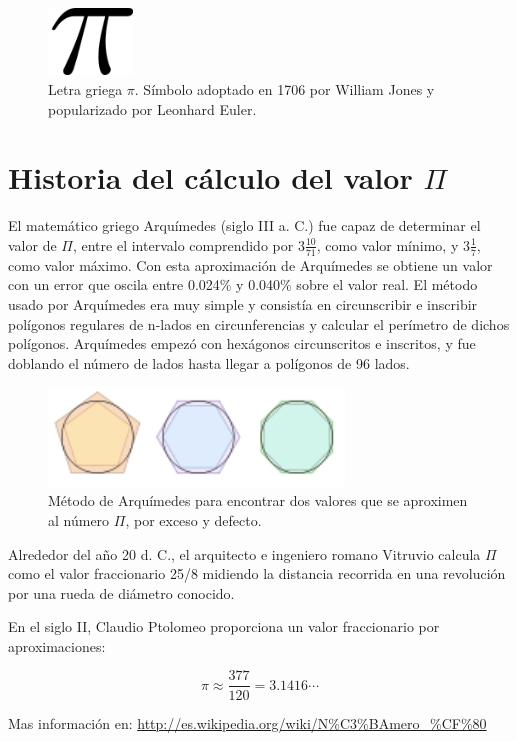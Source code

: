 \documentclass[12pt,letterpaper]{article}
\begin{document}
\begin{figure}[h] 
	\centering
	\includegraphics[width=0.2\textwidth]{img/pi.png}
	\caption{Letra griega $\pi$. Símbolo adoptado en 1706 por William Jones y popularizado por Leonhard Euler.}
\end{figure}

\section{Historia del cálculo del valor $\Pi$}

El matemático griego Arquímedes (siglo III a. C.) fue capaz de de\-ter\-mi\-nar el valor de $\Pi$, entre el intervalo comprendido por $3 \frac{10}{71}$, como valor mínimo, y $3 \frac{1}{7}$, como valor máximo. Con esta aproximación de Arquímedes se obtiene un valor con un error que oscila entre 0.024\% y 0.040\% sobre el valor real. El método usado por Arquímedes era muy simple y consistía en cir\-cuns\-cri\-bir e inscribir polígonos regulares de n-lados en circunferencias y calcular el perímetro de dichos polígonos. Arquímedes empezó con hexágonos circunscritos e inscritos, y fue doblando el número de lados hasta llegar a polígonos de 96 lados.

\begin{figure}[h] 
	\centering
	\includegraphics[width=0.7\textwidth]{img/Archimedes_pi.png}
	\caption{Método de Arquímedes para encontrar dos valores que se aproximen al número $\Pi$, por exceso y defecto.}
\end{figure}


Alrededor del año 20 d. C., el arquitecto e ingeniero romano Vitruvio calcula $\Pi$ como el valor fraccionario 25/8 midiendo la distancia recorrida en una revolución por una rueda de diámetro conocido.

En el siglo II, Claudio Ptolomeo proporciona un valor fraccionario por aproximaciones:

\begin{displaymath}
	\pi \approx \frac{377}{120} = 3.1416 \cdots
\end{displaymath}

Mas información en: \url{http://es.wikipedia.org/wiki/N\%C3\%BAmero\_\%CF\%80}
\end{document}
